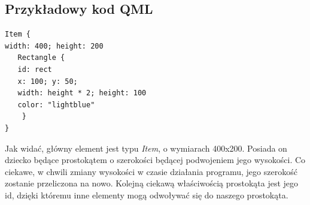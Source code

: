 \subsection{Przykładowy kod QML}

\begin{verbatim}
Item {
width: 400; height: 200
   Rectangle {
   id: rect
   x: 100; y: 50;
   width: height * 2; height: 100
   color: "lightblue"
    }
}
\end{verbatim}

Jak widać, główny element jest typu \textit{Item}, o wymiarach 400x200. Posiada on dziecko będące prostokątem o szerokości będącej podwojeniem jego wysokości. Co ciekawe, w chwili zmiany wysokości w czasie działania programu, jego szerokość zostanie przeliczona na nowo. Kolejną ciekawą właściwością prostokąta jest jego id, dzięki któremu inne elementy mogą odwoływać się do naszego prostokąta.

